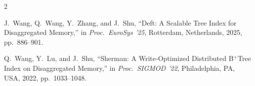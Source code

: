 \documentclass[10pt]{article}
\begin{document}
\begin{thebibliography}{2}

J.~Wang, Q.~Wang, Y.~Zhang, and J.~Shu,
``Deft: A Scalable Tree Index for Disaggregated Memory,''
in \emph{Proc.\ EuroSys '25}, Rotterdam, Netherlands, 2025, pp.~886--901.

Q.~Wang, Y.~Lu, and J.~Shu,
``Sherman: A Write-Optimized Distributed B$^+$Tree Index on Disaggregated Memory,''
in \emph{Proc.\ SIGMOD '22}, Philadelphia, PA, USA, 2022, pp.~1033--1048.

\end{thebibliography}
\end{document}
